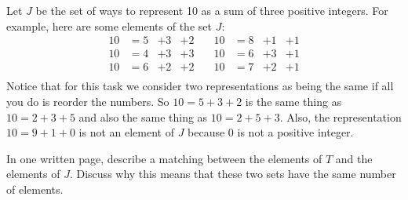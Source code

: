 \documentclass[12pt,letterpaper]{article}
\begin{document}
Let $J$ be the set of ways to represent 10 as a sum of three positive integers.
For example, here are some elements of the set $J$:
\begin{equation*}
\begin{array}{cccc}
10 & = 5 &+ 3 &+ 2 \\
10 & = 4 &+ 3 &+ 3\\
10 & = 6 & +2 &+ 2 \\
\end{array}
\quad
\begin{array}{cccc}
10 & = 8 &+ 1 &+ 1 \\
10 & = 6 &+ 3 &+ 1\\
10 & = 7 & +2 &+ 1 \\
\end{array}
\end{equation*}
Notice that for this task we consider two representations as being the same if all you do is reorder the numbers.
So $10 = 5 + 3 +2$ is the same thing as $10 = 2 + 3 + 5$ and also the same thing as $10 = 2 + 5 + 3$.
Also, the representation $10 = 9 + 1 + 0$ is not an element of $J$ because $0$ is not a positive integer.

In one written page, describe a matching between the elements of $T$ and the elements of $J$.
Discuss why this means that these two sets have the same number of elements.
\end{document}

